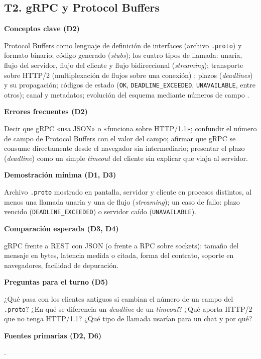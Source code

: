 \documentclass[11pt,a4paper]{article}
\newcommand{\campo}[1]{\par\smallskip\textbf{\color{uteqBlue}#1}\par}
\begin{document}
\subsection{T2. gRPC y Protocol Buffers}
\begin{fichaBox}[title={Ficha T2 --- gRPC}]
	\campo{Conceptos clave (D2)}
	Protocol Buffers como lenguaje de definición de interfaces (archivo \texttt{.proto}) y formato binario; código generado (\emph{stubs}); los cuatro tipos de llamada: unaria, flujo del servidor, flujo del cliente y flujo bidireccional (\emph{streaming}); transporte sobre HTTP/2 (multiplexación de flujos sobre una conexión) \cite{rfc9113}; plazos (\emph{deadlines}) y su propagación; códigos de estado (\texttt{OK}, \texttt{DEADLINE\_EXCEEDED}, \texttt{UNAVAILABLE}, entre otros); canal y metadatos; evolución del esquema mediante números de campo \cite{grpc2026concepts,grpc2026deadlines,protobuf2026proto3}.
	\campo{Errores frecuentes (D2)}
	Decir que gRPC «usa JSON» o «funciona sobre HTTP/1.1»; confundir el número de campo de Protocol Buffers con el valor del campo; afirmar que gRPC se consume directamente desde el navegador sin intermediario; presentar el plazo (\emph{deadline}) como un simple \emph{timeout} del cliente sin explicar que viaja al servidor.
	\campo{Demostración mínima (D1, D3)}
	Archivo \texttt{.proto} mostrado en pantalla, servidor y cliente en procesos distintos, al menos una llamada unaria y una de flujo (\emph{streaming}); un caso de fallo: plazo vencido (\texttt{DEADLINE\_EXCEEDED}) o servidor caído (\texttt{UNAVAILABLE}).
	\campo{Comparación esperada (D3, D4)}
	gRPC frente a REST con JSON (o frente a RPC sobre sockets): tamaño del mensaje en bytes, latencia medida o citada, forma del contrato, soporte en navegadores, facilidad de depuración.
	\campo{Preguntas para el turno (D5)}
	¿Qué pasa con los clientes antiguos si cambian el número de un campo del \texttt{.proto}? ¿En qué se diferencia un \emph{deadline} de un \emph{timeout}? ¿Qué aporta HTTP/2 que no tenga HTTP/1.1? ¿Qué tipo de llamada usarían para un chat y por qué?
	\campo{Fuentes primarias (D2, D6)}
	\cite{grpc2026concepts,grpc2026deadlines,protobuf2026proto3,rfc9113,seemakhupt2023rpc}.
\end{fichaBox}

\end{document}
